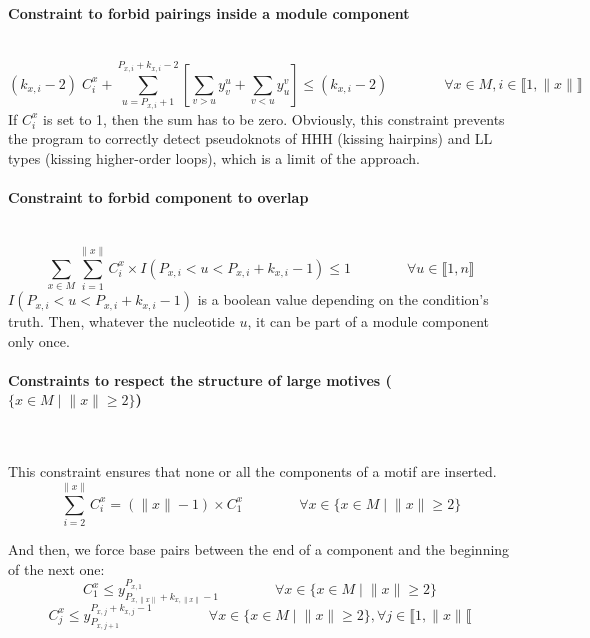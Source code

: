 \documentclass{article}
\begin{document}
\paragraph{Constraint to forbid pairings inside a module component} ~ 
\begin{equation} \label{constraint:4}
	(k_{x,i}-2) \; C^x_i + \sum_{u=P_{x,i}+1}^{P_{x,i}+k_{x,i}-2}\left[ \sum_{v>u} y^u_v + \sum_{v<u} y^v_u \right] \leq (k_{x,i} - 2)
	\qquad \qquad \forall x \in M, i \in \llbracket 1,\|x\| \rrbracket
\end{equation}
If $C^x_i$ is set to 1, then the sum has to be zero. Obviously, this constraint prevents the program to correctly detect pseudoknots of HHH (kissing hairpins) and LL types (kissing higher-order loops), which is a limit of the approach.

\paragraph{Constraint to forbid component to overlap} ~
\begin{equation} \label{constraint:5}
	\sum_{x \in M} \sum_{i=1}^{\|x\|} C^x_i \times I(P_{x,i}<u<P_{x,i}+k_{x,i}-1) \leq 1 \qquad \qquad \forall u \in \llbracket 1,n \rrbracket
\end{equation}
$I(P_{x,i}<u<P_{x,i}+k_{x,i}-1)$ is a boolean value depending on the condition's truth. Then, whatever the nucleotide $u$, it can be part of a module component only once.

\paragraph{Constraints to respect the structure of large motives ($\{ x\in M \; | \; \|x\| \geq 2\}$)} ~ 

This constraint ensures that none or all the components of a motif are inserted.
\begin{equation}\label{constraint:6}
	\sum_{i=2}^{\|x\|} C^x_i = (\|x\| - 1) \times C^{x}_{1}	 \qquad \qquad \forall x \in \{ x\in M \; | \; \|x\| \geq 2\}
\end{equation}

And then, we force base pairs between the end of a component and the beginning of the next one:
\begin{equation}\label{constraint:7}
	C^x_1 \leq y^{P_{x,1}}_{P_{x,\|x\|}+k_{x,\|x\|}-1} \qquad \qquad \forall x \in \{ x\in M \; | \; \|x\| \geq 2\}
\end{equation}
\begin{equation}\label{constraint:8}
	C^x_j \leq y^{P_{x,j}+k_{x,j}-1}_{P_{x,j+1}} \qquad \qquad \forall x \in \{ x\in M \; | \; \|x\| \geq 2\}, \forall j \in \llbracket 1,\|x\| \llbracket
\end{equation}
\end{document}
